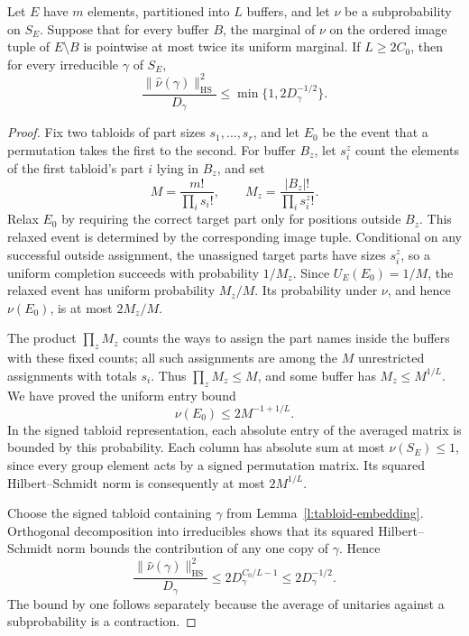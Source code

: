 \begin{lemma}
\label{l:tabloid-hs}
Let $E$ have $m$ elements, partitioned into $L$ buffers, and let
$\nu$ be a subprobability on $S_E$.  Suppose that for every buffer
$B$, the marginal of $\nu$ on the ordered image tuple of
$E\setminus B$ is pointwise at most twice its uniform marginal.
If $L\ge2C_0$, then for every irreducible $\gamma$ of $S_E$,
\begin{equation}
 \frac{\|\widehat\nu(\gamma)\|_{\mathrm{HS}}^2}{D_\gamma}
 \le \min\{1,2D_\gamma^{-1/2}\}.
 \label{l:tabloid-normalized-hs}
\end{equation}
\end{lemma}

\begin{proof}
Fix two tabloids of part sizes $s_1,\ldots,s_r$, and let $E_0$ be
the event that a permutation takes the first to the second.
For buffer $B_z$, let $s_i^z$ count the elements of the first
tabloid's part $i$ lying in $B_z$, and set
\[
 M=\frac{m!}{\prod_i s_i!},\qquad
 M_z=\frac{|B_z|!}{\prod_i s_i^z!}.
\]
Relax $E_0$ by requiring the correct target part only for positions
outside $B_z$.  This relaxed event is determined by the corresponding
image tuple.  Conditional on any successful outside assignment,
the unassigned target parts have sizes $s_i^z$, so a uniform
completion succeeds with probability $1/M_z$.
Since $U_E(E_0)=1/M$, the relaxed event has uniform probability
$M_z/M$.  Its probability under $\nu$, and hence $\nu(E_0)$,
is at most $2M_z/M$.

The product $\prod_zM_z$ counts the ways to assign the part names
inside the buffers with these fixed counts; all such assignments
are among the $M$ unrestricted assignments with totals $s_i$.
Thus $\prod_zM_z\le M$, and some buffer has $M_z\le M^{1/L}$.
We have proved the uniform entry bound
\[
 \nu(E_0)\le2M^{-1+1/L}.
\]
In the signed tabloid representation, each absolute entry of the
averaged matrix is bounded by this probability.  Each column has
absolute sum at most $\nu(S_E)\le1$, since every group element
acts by a signed permutation matrix.  Its squared Hilbert--Schmidt
norm is consequently at most $2M^{1/L}$.

Choose the signed tabloid containing $\gamma$ from
Lemma~\ref{l:tabloid-embedding}.  Orthogonal decomposition into
irreducibles shows that its squared Hilbert--Schmidt norm bounds
the contribution of any one copy of $\gamma$.  Hence
\[
 \frac{\|\widehat\nu(\gamma)\|_{\mathrm{HS}}^2}{D_\gamma}
 \le2D_\gamma^{C_0/L-1}\le2D_\gamma^{-1/2}.
\]
The bound by one follows separately because the average of
unitaries against a subprobability is a contraction.
\end{proof}

